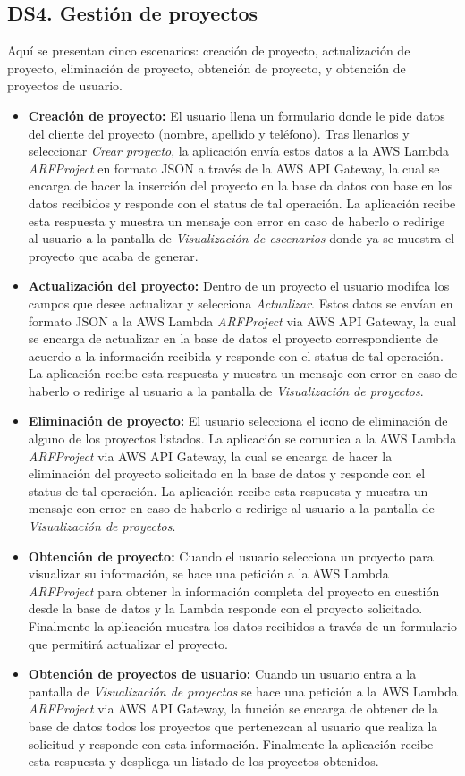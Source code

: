 \subsection{DS4. Gestión de proyectos}
Aquí se presentan cinco escenarios: creación de proyecto, actualización de proyecto, eliminación de proyecto, obtención de proyecto, y obtención de proyectos de usuario.
\begin{itemize}
	\item \textbf{Creación de proyecto:} El usuario llena un formulario donde le pide datos del cliente del proyecto (nombre, apellido y  teléfono). Tras llenarlos y seleccionar \textit{Crear proyecto}, la aplicación envía estos datos a la AWS Lambda \textit{ARFProject} en formato JSON a través de la AWS API Gateway, la cual se encarga de hacer la inserción del proyecto en la base da datos con base en los datos recibidos y responde con el status de tal operación. La aplicación recibe esta respuesta y muestra un mensaje con error en caso de haberlo o redirige al usuario a la pantalla de \textit{Visualización de escenarios} donde ya se muestra el proyecto que acaba de generar.
	\item \textbf{Actualización del proyecto: } Dentro de un proyecto el usuario modifca los campos que desee actualizar y selecciona \textit{Actualizar}. Estos datos se envían en formato JSON a la AWS Lambda \textit{ARFProject} via AWS API Gateway, la cual se encarga de actualizar en la base de datos el proyecto correspondiente de acuerdo a la información recibida y responde con el status de tal operación. La aplicación recibe esta respuesta y muestra un mensaje con error en caso de haberlo o redirige al usuario a la pantalla de \textit{Visualización de proyectos}.
	\item \textbf{Eliminación de proyecto:} El usuario selecciona el icono de eliminación de alguno de los proyectos listados. La aplicación se comunica a la AWS Lambda \textit{ARFProject} via AWS API Gateway, la cual se encarga de hacer la eliminación del proyecto solicitado en la base de datos y responde con el status de tal operación. La aplicación recibe esta respuesta y muestra un mensaje con error en caso de haberlo o redirige al usuario a la pantalla de \textit{Visualización de proyectos}.
	\item \textbf{Obtención de proyecto:} Cuando el usuario selecciona un proyecto para visualizar su información, se hace una petición a la AWS Lambda \textit{ARFProject} para obtener la información completa del proyecto en cuestión desde la base de datos y la Lambda responde con el proyecto solicitado. Finalmente la aplicación muestra los datos recibidos a través de un formulario que permitirá actualizar el proyecto.
	\item \textbf{Obtención de proyectos de usuario:} Cuando un usuario entra a la pantalla de \textit{Visualización de proyectos} se hace una petición a la AWS Lambda \textit{ARFProject} via AWS API Gateway, la función se encarga de obtener de la base de datos todos los proyectos que pertenezcan al usuario que realiza la solicitud y responde con esta información. Finalmente la aplicación recibe esta respuesta y despliega un listado de los proyectos obtenidos.
\end{itemize}

